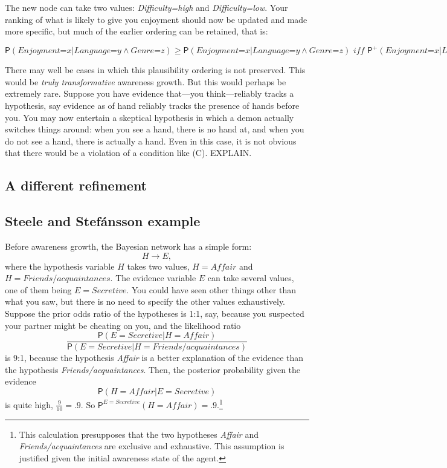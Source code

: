 \documentclass[
  11pt,
  dvipsnames,enabledeprecatedfontcommands]{scrartcl}
\newcommand{\pr}[1]{\ensuremath{\mathsf{P}(#1)}}
\newcommand{\ppr}[2]{\ensuremath{\mathsf{P}^{#1}(#2)}}
\begin{document}
\noindent The new node can take two values: \textit{Difficulty=high} and
\textit{Difficulty=low}. Your ranking of what is likely to give you
enjoyment should now be updated and made more specific, but much of the
earlier ordering can be retained, that is:

\[\pr{\textit{Enjoyment=x} \vert \textit{Language=y} \wedge \textit{Genre=z}} \geq \pr{\textit{Enjoyment=x} \vert \textit{Language=y} \wedge \textit{Genre=z}} \textit{ iff } \ppr{+}{\textit{Enjoyment=x} \vert \textit{Language=y} \wedge \textit{Genre=z}} \geq \ppr{+}{\textit{Enjoyment=x} \vert \textit{Language=y} \wedge \textit{Genre=z}}.\]

There may well be cases in which this plausibility ordering is not
preserved. This would be \textit{truly transformative} awareness growth.
But this would perhaps be extremely rare. Suppose you have evidence
that---you think---reliably tracks a hypothesis, say evidence as of hand
reliably tracks the presence of hands before you. You may now entertain
a skeptical hypothesis in which a demon actually switches things around:
when you see a hand, there is no hand at, and when you do not see a
hand, there is actually a hand. Even in this case, it is not obvious
that there would be a violation of a condition like (C). EXPLAIN.

\hypertarget{a-different-refinement}{%
\subsection{A different refinement}\label{a-different-refinement}}

\hypertarget{steele-and-stefuxe1nsson-example}{%
\subsection{Steele and Stefánsson
example}\label{steele-and-stefuxe1nsson-example}}

Before awareness growth, the Bayesian network has a simple form:
\[H \rightarrow E,\] where the hypothesis variable \(H\) takes two
values, \(H=\textit{Affair}\) and \(H=\textit{Friends/acquaintances}\).
The evidence variable \(E\) can take several values, one of them being
\(E=\textit{Secretive}\). You could have seen other things other than
what you saw, but there is no need to specify the other values
exhaustively. Suppose the prior odds ratio of the hypotheses is 1:1,
say, because you suspected your partner might be cheating on you, and
the likelihood ratio
\[\frac{\pr{E=\textit{Secretive}\vert H=\textit{Affair}}}{\pr{E=\textit{Secretive}\vert H=\textit{Friends/acquaintances}}}\]
is 9:1, because the hypothesis \textit{Affair} is a better explanation
of the evidence than the hypothesis \textit{Friends/acquaintances}.
Then, the posterior probability given the evidence
\[\pr{H=\textit{Affair} \vert E=\textit{Secretive}}\] is quite high,
\(\frac{9}{10}=.9\). So
\(\ppr{E=\textit{Secretive}}{H=\textit{Affair}}=.9\).\footnote{This
  calculation presupposes that the two hypotheses \textit{Affair} and
  \textit{Friends/acquaintances} are exclusive and exhaustive. This
  assumption is justified given the initial awareness state of the
  agent.}
\end{document}
